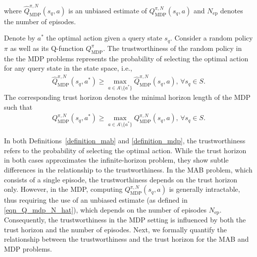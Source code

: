 %
where $\hat{Q}_\text{MDP}^{\pi, N}(s_q, a)$ is an unbiased estimate of $Q_\text{MDP}^{\pi, N}(s_q, a)$ and $N_\text{ep}$ denotes the number of episodes.
%
%
\begin{definition}[MDP]\label{definition_mdp}
    Denote by $a^*$ the optimal action given a query state $s_q$. Consider a random policy $\pi$ as well as its Q-function $Q_\text{MDP}^\pi$.
    The trustworthiness of the random policy in the the MDP problems represents the probability of selecting the optimal action for any query state in the state space, i.e.,
    \begin{align}
        \hat{Q}_\text{MDP}^{\pi, N}(s_q, a^*) \geq \max_{a \in A \setminus \{a^*\}} \hat{Q}_\text{MDP}^{\pi, N}(s_q, a), \, \forall s_q \in S.
    \end{align}
    The corresponding trust horizon denotes the minimal horizon length of the MDP such that
    \begin{align}
        Q_\text{MDP}^{\pi, N}(s_q, a^*) \geq \max_{a \in A \setminus \{a^*\}} Q_\text{MDP}^{\pi, N}(s_q, a), \, \forall s_q \in S.
    \end{align}
\end{definition}






In both Definitions~\ref{definition_mab} and \ref{definition_mdp}, the trustworthiness refers to the probability of selecting the optimal action. While the trust horizon in both cases approximates the infinite-horizon problem, they show subtle differences in the relationship to the trustworthiness.
%
In the MAB problem, which consists of a single episode, the trustworthiness depends on the trust horizon only. However, in the MDP, computing \( Q_\text{MDP}^{\pi, N}(s_q, a) \) is generally intractable, thus requiring the use of an unbiased estimate (as defined in \eqref{eqn_Q_mdp_N_hat}), which depends on the number of episodes \( N_\text{ep} \). Consequently, the trustworthiness in the MDP setting is influenced by both the trust horizon and the number of episodes. 
%
Next, we formally quantify the relationship between the trustworthiness and the trust horizon for the MAB and MDP problems.



